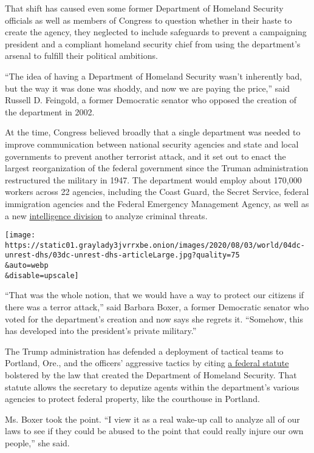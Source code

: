 That shift has caused even some former Department of Homeland Security
officials as well as members of Congress to question whether in their
haste to create the agency, they neglected to include safeguards to
prevent a campaigning president and a compliant homeland security chief
from using the department's arsenal to fulfill their political
ambitions.

``The idea of having a Department of Homeland Security wasn't inherently
bad, but the way it was done was shoddy, and now we are paying the
price,'' said Russell D. Feingold, a former Democratic senator who
opposed the creation of the department in 2002.

At the time, Congress believed broadly that a single department was
needed to improve communication between national security agencies and
state and local governments to prevent another terrorist attack, and it
set out to enact the largest reorganization of the federal government
since the Truman administration restructured the military in 1947. The
department would employ about 170,000 workers across 22 agencies,
including the Coast Guard, the Secret Service, federal immigration
agencies and the Federal Emergency Management Agency, as well as a new
\href{https://www.nytimes3xbfgragh.onion/2020/08/01/us/politics/brian-murphy-homeland-security-protesters.html}{intelligence
division} to analyze criminal threats.

\texttt{[image: https://static01.graylady3jvrrxbe.onion/images/2020/08/03/world/04dc-unrest-dhs/03dc-unrest-dhs-articleLarge.jpg?quality=75\\\&auto=webp\\\&disable=upscale]}

``That was the whole notion, that we would have a way to protect our
citizens if there was a terror attack,'' said Barbara Boxer, a former
Democratic senator who voted for the department's creation and now says
she regrets it. ``Somehow, this has developed into the president's
private military.''

The Trump administration has defended a deployment of tactical teams to
Portland, Ore., and the officers' aggressive tactics by citing
\href{https://www.law.cornell.edu/uscode/text/40/1315}{a federal
statute} bolstered by the law that created the Department of Homeland
Security. That statute allows the secretary to deputize agents within
the department's various agencies to protect federal property, like the
courthouse in Portland.

Ms. Boxer took the point. ``I view it as a real wake-up call to analyze
all of our laws to see if they could be abused to the point that could
really injure our own people,'' she said.

